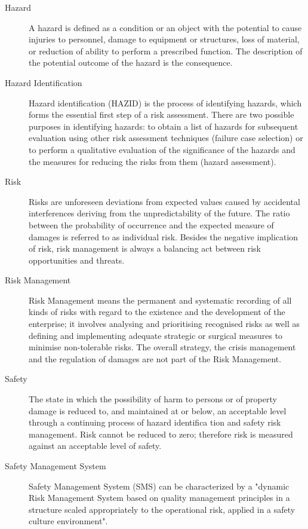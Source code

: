 \documentclass[a4paper, 10pt]{article}
\begin{document}
\begin{description}
		\item[Hazard] A hazard is defined as a condition or an object with the potential to cause injuries to personnel, damage to equipment or structures, loss of material, or reduction of ability to perform a
				prescribed function. The description of the potential outcome of the hazard is
				the consequence.
		\item[Hazard Identification] Hazard identification (HAZID) is the process of identifying hazards, which forms the essential 
				first step of a risk assessment. There are two possible purposes in identifying
				hazards: to obtain a list of hazards for subsequent evaluation using other risk assessment
				techniques (failure case selection) or to perform a qualitative evaluation of the significance of
				the hazards and the measures for reducing the risks from them (hazard assessment).
		\item[Risk] Risks are unforeseen deviations from expected values caused by accidental interferences deriving
				from the unpredictability of the future. The ratio between
				the probability of occurrence and the expected measure of damages is referred to as individual
				risk. Besides the negative implication of risk, risk management
				is always a balancing act between risk opportunities and threats.
		\item[Risk Management] Risk Management means the permanent and systematic recording of all kinds of risks with
				regard to the existence and the development of the enterprise; it involves analysing and prioritising
				recognised risks as well as defining and implementing adequate strategic or surgical
				measures to minimise non-tolerable risks. The overall strategy, the
				crisis management and the regulation of damages are not part of the Risk Management.
		\item[Safety] The state in which the possibility of harm to persons or of property damage is reduced to, and
				maintained at or below, an acceptable level through a continuing process of hazard identifica
				tion and safety risk management. Risk cannot be reduced to zero; therefore risk is
				measured against an acceptable level of safety.
		\item[Safety Management System] Safety Management System (SMS) can be characterized by a "dynamic Risk Management
				System based on quality management principles in a structure scaled appropriately to the operational risk, applied in a safety culture environment".

\end{description}
\end{document}
